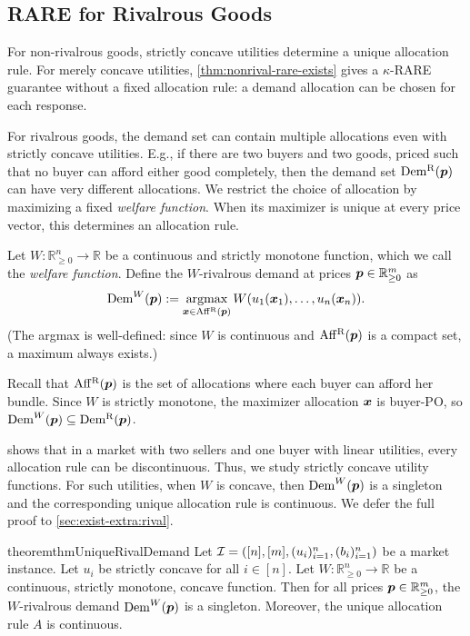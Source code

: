 \subsection{RARE for Rivalrous Goods}
\label{sec:exist:rival}

For non-rivalrous goods, strictly concave utilities determine a unique allocation rule.
For merely concave utilities, \cref{thm:nonrival-rare-exists} gives a $\kappa$-RARE guarantee
without a fixed allocation rule: a demand allocation can be chosen for each response.

For rivalrous goods, the demand set can contain multiple allocations even with strictly concave utilities.
E.g., if there are two buyers and two goods, priced such that no buyer can afford either good completely,
then the demand set $\operatorname{Dem^{\mathrm{R}}}(\bm{p})$ can have very different allocations.
We restrict the choice of allocation by maximizing a fixed \emph{welfare function}.
When its maximizer is unique at every price vector, this determines an allocation rule.

\begin{definition}
Let $W: \mathbb{R}_{\ge 0}^n \to \mathbb{R}$ be a continuous
and strictly monotone function, which we call the \emph{welfare function}.
Define the $W$-rivalrous demand at prices $\bm{p} \in \mathbb{R}_{\ge 0}^m$ as
\[ \operatorname{Dem}^W(\bm{p}) := \operatorname*{argmax}_{\bm{x} \in \operatorname{Aff^{\mathrm{R}}}(\bm{p})} W(u_1(\bm{x}_1), \ldots, u_n(\bm{x}_n)). \]
(The argmax is well-defined: since $W$ is continuous and $\operatorname{Aff^{\mathrm{R}}}(\bm{p})$ is a compact set, a maximum always exists.)
\end{definition}

Recall that $\operatorname{Aff^{\mathrm{R}}}(\bm{p})$ is the set of allocations where each buyer can afford her bundle.
Since $W$ is strictly monotone, the maximizer allocation $\bm{x}$ is buyer-PO, so $\operatorname{Dem}^W(\bm{p}) \subseteq \operatorname{Dem^{\mathrm{R}}}(\bm{p})$.

 shows that in a market with two sellers and one buyer
with linear utilities, every allocation rule can be discontinuous.
Thus, we study strictly concave utility functions.
For such utilities, when $W$ is concave, then $\operatorname{Dem}^W(\bm{p})$ is a singleton
and the corresponding unique allocation rule is continuous.
We defer the full proof to \cref{sec:exist-extra:rival}.

\begin{restatable}{theorem}{thmUniqueRivalDemand}
\label{thm:unique-rival-demand}
Let $\mathcal{I} = ([n], [m], (u_i)_{i=1}^n, (b_i)_{i=1}^n)$ be a market instance.
Let $u_i$ be strictly concave for all $i \in [n]$.
Let $W: \mathbb{R}_{\ge 0}^n \to \mathbb{R}$ be a continuous, strictly monotone, concave function.
Then for all prices $\bm{p} \in \mathbb{R}_{\ge 0}^m$,
the $W$-rivalrous demand $\operatorname{Dem}^W(\bm{p})$ is a singleton.
Moreover, the unique allocation rule $A$ is continuous.
\end{restatable}

